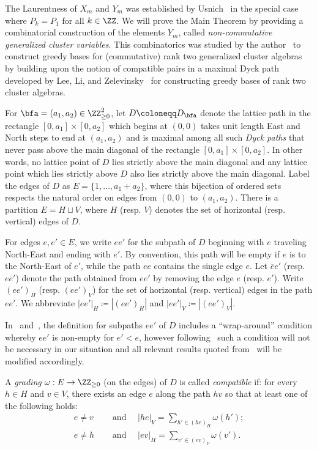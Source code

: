  The Laurentness of $X_m$ and $Y_m$ was established by Usnich~\cite{usnich2} in the special case where $P_k=P_1$ for all $k\in\ZZ$.
 We will prove the Main Theorem by providing a combinatorial construction of the elements $Y_m$, called \emph{non-commutative generalized cluster variables}. 
 This combinatorics was studied by the author~\cite{rupel2} to construct greedy bases for (commutative) rank two generalized cluster algebras by building upon the notion of compatible pairs in a maximal Dyck path developed by Lee, Li, and Zelevinsky~\cite{lee-li-zelevinsky} for constructing greedy bases of rank two cluster algebras.

 For $\bfa=(a_1,a_2)\in\ZZ_{\ge0}^2$, let $D\coloneqq D_\bfa$ denote the lattice path in the rectangle $[0,a_1]\times[0,a_2]$ which begins at $(0,0)$ takes unit length East and North steps to end at $(a_1,a_2)$ and is maximal among all such \emph{Dyck paths} that never pass above the main diagonal of the rectangle $[0,a_1]\times[0,a_2]$. 
 In other words, no lattice point of $D$ lies strictly above the main diagonal and any lattice point which lies strictly above $D$ also lies strictly above the main diagonal.
 Label the edges of $D$ as $E=\{1,\ldots,a_1+a_2\}$, where this bijection of ordered sets respects the natural order on edges from $(0,0)$ to $(a_1,a_2)$.
 There is a partition $E=H\sqcup V$, where $H$ (resp. $V$) denotes the set of horizontal (resp. vertical) edges of $D$. 

 For edges $e,e'\in E$, we write $ee'$ for the subpath of $D$ beginning with $e$ traveling North-East and ending with $e'$. 
 By convention, this path will be empty if $e$ is to the North-East of $e'$, while the path $ee$ contains the single edge $e$. 
 Let $\overline{e}e'$ (resp. $e\overline{e}'$) denote the path obtained from $ee'$ by removing the edge $e$ (resp. $e'$). 
 Write $(ee')_H$ (resp. $(ee')_V$) for the set of horizontal (resp. vertical) edges in the path $ee'$.
 We abbreviate $|ee'|_H\coloneqq |(ee')_H|$ and $|ee'|_V\coloneqq |(ee')_V|$. 
 
 \begin{remark}
 In~\cite{lee-li-zelevinsky} and~\cite{rupel2}, the definition for subpaths $ee'$ of $D$ includes a ``wrap-around'' condition whereby $ee'$ is non-empty for $e'<e$, however following~\cite[Remark~2.21]{rupel2} such a condition will not be necessary in our situation and all relevant results quoted from~\cite{rupel2} will be modified accordingly.
 \end{remark}

 \begin{definition}
 \label{def:compatibility}
 A \emph{grading} $\omega:E\to\ZZ_{\ge0}$ (on the edges) of $D$ is called \emph{compatible} if: for every $h\in H$ and $v\in V$, there exists an edge $e$ along the path $hv$ so that at least one of the following holds:
 \begin{align}
 \tag{HGC}\label{eq:hgc} e\ne v\quad&\text{ and }\quad |he|_V=\sum\limits_{h'\in(he)_H} \omega(h');\\
 \tag{VGC}\label{eq:vgc} e\ne h\quad&\text{ and }\quad |ev|_H=\sum\limits_{v'\in(ev)_V} \omega(v').
 \end{align}
 \end{definition}

